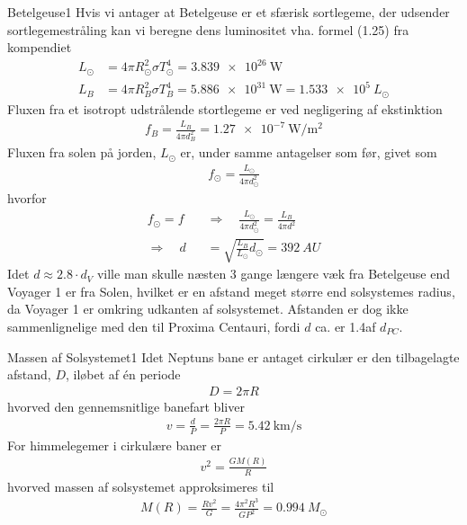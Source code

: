 \begin{opgave}{Betelgeuse}{1}
	\opg Hvis vi antager at Betelgeuse er et sfærisk sortlegeme, der udsender sortlegemestråling kan vi beregne dens luminositet vha. formel (1.25) fra kompendiet
	\begin{align*}
	L_\odot &= 4\pi R_\odot^2\sigma T_\odot^4 =\SI{3.839e26}{\watt} \\
	L_B &= 4\pi R_B^2\sigma T_B^4 =\SI{5,886e31}{\watt} = \SI{1,533e5}{L_\odot}
	\end{align*}
	\opg Fluxen fra et isotropt udstrålende stortlegeme er ved negligering af ekstinktion
	\begin{align*}
	f_B = \frac{L_B}{4\pi d_B^2} = \SI{1,27e-7}{\watt\per\metre\squared}
	\end{align*}
	\opg Fluxen fra solen på jorden, $L_\odot$ er, under samme antagelser som før, givet som
	\begin{align*}
	f_\odot = \frac{L_\odot}{4\pi d_\odot^2}
	\end{align*}
	hvorfor
	\begin{align*}
	f_\odot = f \quad&\Rightarrow\quad \frac{L_\odot}{4\pi d_\odot^2} = \frac{L_B}{4\pi d^2} \\
	\Rightarrow\quad d &= \sqrt{\frac{L_B}{L_\odot}d_\odot} = \SI{392}{AU}
	\end{align*}
	\opg Idet $d\approx2.8\cdot d_V$ ville man skulle næsten 3 gange længere væk fra Betelgeuse end Voyager 1 er fra Solen, hvilket er en afstand meget større end solsystemes radius, da Voyager 1 er omkring udkanten af solsystemet. Afstanden er dog ikke sammenlignelige med den til Proxima Centauri, fordi $d$ ca. er 1.4\permil af $d_{PC}$.
\end{opgave}
\begin{opgave}{Massen af Solsystemet}{1}
	\opg Idet Neptuns bane er antaget cirkulær er den tilbagelagte afstand, $D$, iløbet af én periode
	\begin{align*}
	D = 2\pi R
	\end{align*}
	hvorved den gennemsnitlige banefart bliver
	\begin{align*}
	v = \frac{d}{P} = \frac{2\pi R}{P} = \SI{5,42}{\kilo\metre\per\second}
	\end{align*}
	\opg For himmelegemer i cirkulære baner er
	\begin{align*}
	v^2 = \frac{GM(R)}{R}
	\end{align*}
	hvorved massen af solsystemet approksimeres til
	\begin{align*}
	M(R) = \frac{Rv^2}{G} = \frac{4\pi^2R^3}{GP^2} = \SI{0,994}{M_\odot}
	\end{align*}
\end{opgave}


